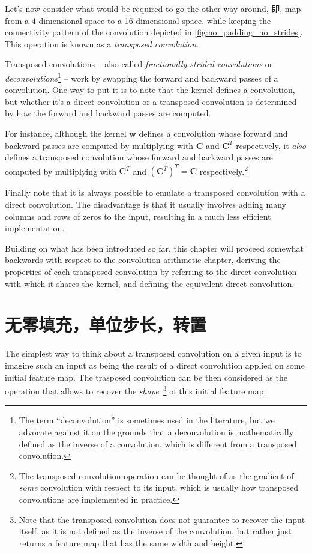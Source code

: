 \documentclass[notitlepage]{ctexrep}
\begin{document}
Let's now consider what would be required to go the other way around, 即, map
from a 4-dimensional space to a 16-dimensional space, while keeping the
connectivity pattern of the convolution depicted in
\autoref{fig:no_padding_no_strides}. This operation is known as a {\em
transposed convolution}.

Transposed convolutions -- also called {\em fractionally strided convolutions\/}
or {\em deconvolutions\/}\footnote{The term ``deconvolution'' is sometimes used
in the literature, but we advocate against it on the grounds that a
deconvolution is mathematically defined as the inverse of a convolution, which
is different from a transposed convolution.} -- work by swapping the forward and
backward passes of a convolution. One way to put it is to note that the kernel
defines a convolution, but whether it's a direct convolution or a transposed
convolution is determined by how the forward and backward passes are computed.

For instance, although the kernel $\mathbf{w}$ defines a convolution whose
forward and backward passes are computed by multiplying with $\mathbf{C}$ and
$\mathbf{C}^T$ respectively, it {\em also\/} defines a transposed convolution
whose forward and backward passes are computed by multiplying with
$\mathbf{C}^T$ and $(\mathbf{C}^T)^T = \mathbf{C}$ respectively.\footnote{The
    transposed convolution operation can be thought of as the gradient of {\em
    some\/} convolution with respect to its input, which is usually how
    transposed convolutions are implemented in practice.}

Finally note that it is always possible to emulate a transposed convolution with
a direct convolution. The disadvantage is that it usually involves adding many
columns and rows of zeros to the input, resulting in a much less efficient
implementation.

Building on what has been introduced so far, this chapter will proceed somewhat
backwards with respect to the convolution arithmetic chapter, deriving the
properties of each transposed convolution by referring to the direct
convolution with which it shares the kernel, and defining the equivalent direct
convolution.

\section{无零填充，单位步长，转置}

The simplest way to think about a transposed convolution on a given input is to
imagine such an input as being the result of a direct convolution applied on
some initial feature map. The trasposed convolution can be then considered as
the operation that allows to recover the \emph{shape}~\footnote{Note that the
  transposed convolution does not guarantee to recover the input itself, as it
  is not defined as the inverse of the convolution, but rather just returns a
  feature map that has the same width and height.} of this initial feature map.
\end{document}
